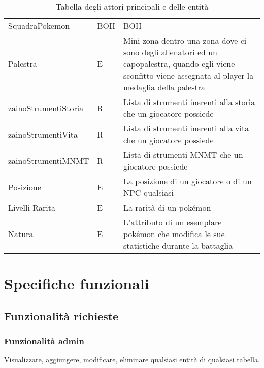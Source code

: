 \documentclass{article}
\begin{document}
\begin{table}[htbp]
\begin{tabular}{|l|l|p{7cm}|}
SquadraPokemon & BOH & BOH \\
Palestra & E & Mini zona dentro una zona dove ci sono degli allenatori ed un capopalestra, quando egli viene sconfitto viene assegnata al player la medaglia della palestra \\
zainoStrumentiStoria & R & Lista di strumenti inerenti alla storia che un giocatore possiede \\
zainoStrumentiVita & R & Lista di strumenti inerenti alla vita che un giocatore possiede \\
zainoStrumentiMNMT & R & Lista di strumenti MNMT che un giocatore possiede \\
Posizione & E & La posizione di un giocatore o di un NPC qualsiasi \\
Livelli Rarita & E & La rarità di un pokémon \\
Natura & E & L'attributo di un esemplare pokémon che modifica le sue statistiche durante la battaglia \\
\hline
\end{tabular}
\caption{Tabella degli attori principali e delle entità}
\end{table}

\section{Specifiche funzionali}
\subsection{Funzionalità richieste}
\subsubsection{Funzionalità admin}
Visualizzare, aggiungere, modificare, eliminare qualsiasi entità di qualsiasi tabella.
\end{document}
